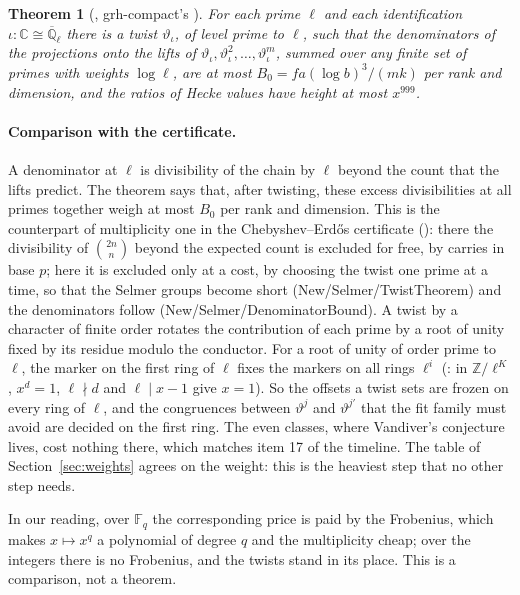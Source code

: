 \documentclass[11pt]{article}
\newtheorem{theorem}{Theorem}[section]
\theoremstyle{definition}
\theoremstyle{remark}
\begin{document}
\begin{theorem}[, grh-compact's ]
For each prime $\ell$ and each identification $\iota\colon\mathbb C\cong\overline{\mathbb Q}_\ell$
there is a twist $\vartheta_\iota$, of level prime to $\ell$, such that the denominators of the
projections onto the lifts of $\vartheta_\iota,\vartheta_\iota^2,\dots,\vartheta_\iota^m$, summed
over any finite set of primes with weights $\log\ell$, are at most $B_0=fa(\log b)^3/(mk)$ per
rank and dimension, and the ratios of Hecke values have height at most $x^{999}$.
\end{theorem}

\paragraph{Comparison with the certificate.} A denominator at $\ell$ is divisibility of the chain
by $\ell$ beyond the count that the lifts predict. The theorem says that, after twisting, these
excess divisibilities at all primes together weigh at most $B_0$ per rank and dimension. This is
the counterpart of multiplicity one in the Chebyshev--Erdős
certificate (): there the divisibility of
$\binom{2n}{n}$ beyond the expected count is excluded for free, by carries in base $p$; here it is
excluded only at a cost, by choosing the twist one prime at a time, so that the Selmer groups
become short (New/Selmer/TwistTheorem) and the denominators follow (New/Selmer/DenominatorBound).
A twist by a character of finite order rotates the contribution of each prime by a root of
unity fixed by its residue modulo the conductor. For a root of unity of order prime to $\ell$, the
marker on the first ring of $\ell$ fixes the markers on all rings $\ell^i$
(: in $\mathbb Z/\ell^K$, $x^d=1$, $\ell\nmid d$ and $\ell\mid x-1$
give $x=1$). So the offsets a twist sets are frozen on every ring of $\ell$, and the congruences
between $\vartheta^j$ and $\vartheta^{j'}$ that the fit family must avoid are decided on the first
ring. The even classes, where Vandiver's conjecture lives, cost nothing there, which matches item 17 of
the timeline. The table of Section~\ref{sec:weights} agrees on the weight: this is the heaviest step that no other step
needs.

In our reading, over $\mathbb F_q$ the corresponding price is paid by the Frobenius, which makes
$x\mapsto x^q$ a polynomial of degree $q$ and the multiplicity cheap; over the integers there is no
Frobenius, and the twists stand in its place. This is a comparison, not a theorem.
\end{document}
